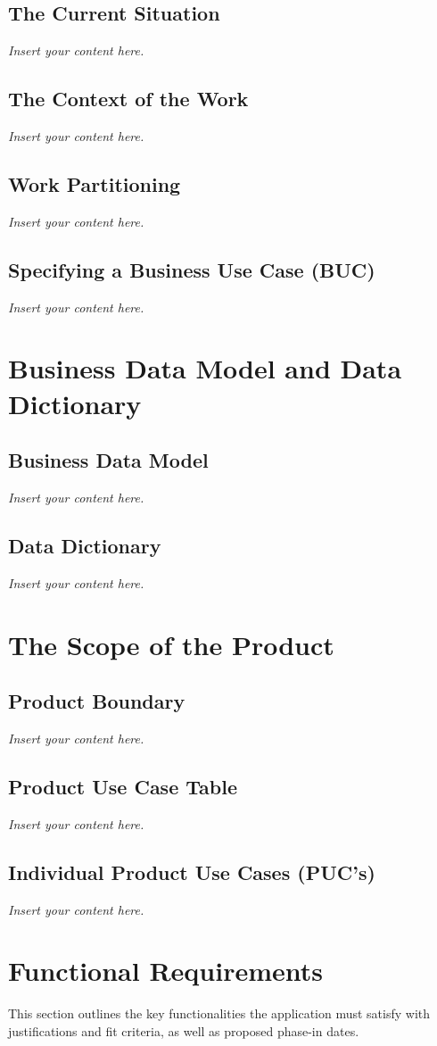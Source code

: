 \documentclass[12pt]{article}
\newcommand{\lips}{\textit{Insert your content here.}}
\begin{document}
\subsection{The Current Situation}
\lips
\subsection{The Context of the Work}
\lips
\subsection{Work Partitioning}
\lips
\subsection{Specifying a Business Use Case (BUC)}
\lips

\section{Business Data Model and Data Dictionary}
\subsection{Business Data Model}
\lips
\subsection{Data Dictionary}
\lips

\section{The Scope of the Product}
\subsection{Product Boundary}
\lips
\subsection{Product Use Case Table}
\lips
\subsection{Individual Product Use Cases (PUC's)}
\lips

\section{Functional Requirements}
This section outlines the key functionalities the application must satisfy with justifications and fit criteria, as well as proposed phase-in dates.
\end{document}
